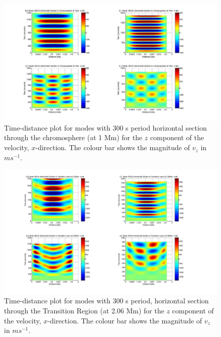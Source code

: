 \documentclass[preprint,authoryear,12pt]{elsarticle}
\begin{document}



\begin{figure}[h]
\includegraphics[scale=0.9]{imrescale/dt_300_0_0_hor_x_1Mm.jpg}
\caption{Time-distance plot for modes with 300 s period horizontal section through the chromosphere (at 1 Mm) for the $z$  component of the velocity, $x$-direction. The colour bar shows the magnitude of $v_z$ in $ms^{-1}$.}
\label{Fig11}
\end{figure}

\begin{figure}[h]
\includegraphics[scale=0.9]{imrescale/dt_300_hor_x_2p06Mm.jpg}
\caption{Time-distance plot for modes with 300 s period, horizontal section through the Transition Region (at 2.06 Mm) 
for the $z$  component of the velocity, $x$-direction. The colour bar shows the magnitude of $v_z$ in $ms^{-1}$.}
\end{figure}
\end{document}
